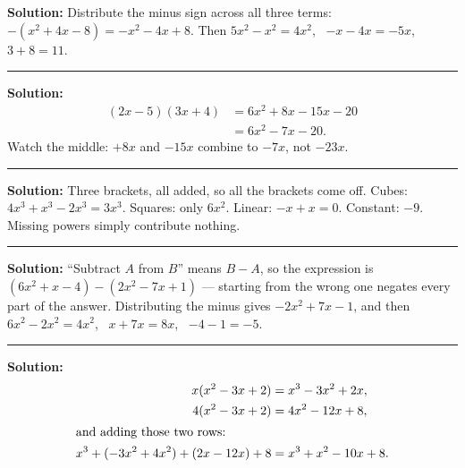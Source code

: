 \documentclass[12pt]{article}
\begin{document}

\textbf{Solution:} \quad Distribute the minus sign across all three terms:
$-(x^2 + 4x - 8) = -x^2 - 4x + 8$. Then
$5x^2 - x^2 = 4x^2$, \ $-x - 4x = -5x$, \ $3 + 8 = 11$. 

\vspace{0.15cm}\noindent\rule{\linewidth}{0.2pt}


\textbf{Solution:}
\begin{align*}
  (2x-5)(3x+4) &= 6x^2 + 8x - 15x - 20\\
               &= 6x^2 - 7x - 20.
\end{align*}
Watch the middle: $+8x$ and $-15x$ combine to $-7x$, not $-23x$. 

\vspace{0.15cm}\noindent\rule{\linewidth}{0.2pt}


\textbf{Solution:} \quad Three brackets, all added, so all the brackets come off.
Cubes: $4x^3 + x^3 - 2x^3 = 3x^3$. Squares: only $6x^2$. Linear: $-x + x = 0$.
Constant: $-9$. Missing powers simply contribute nothing. 

\vspace{0.15cm}\noindent\rule{\linewidth}{0.2pt}


\textbf{Solution:} \quad ``Subtract $A$ from $B$'' means $B - A$, so the expression is
$(6x^2 + x - 4) - (2x^2 - 7x + 1)$ --- starting from the wrong one negates every part of the answer.
Distributing the minus gives $-2x^2 + 7x - 1$, and then
$6x^2 - 2x^2 = 4x^2$, \ $x + 7x = 8x$, \ $-4 - 1 = -5$. 

\vspace{0.15cm}\noindent\rule{\linewidth}{0.2pt}


\textbf{Solution:}
\begin{align*}
  x(x^2 - 3x + 2) &= x^3 - 3x^2 + 2x,\\
  4(x^2 - 3x + 2) &= 4x^2 - 12x + 8,\\
  \intertext{and adding those two rows:}
  x^3 + (-3x^2 + 4x^2) + (2x - 12x) + 8 &= x^3 + x^2 - 10x + 8.
\end{align*}
\end{document}
